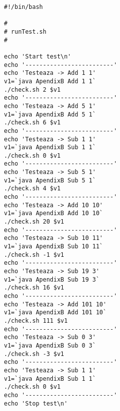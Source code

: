 \scriptsize \begin{verbatim}
#!/bin/bash

#
# runTest.sh
#

echo 'Start test\n'
echo '-------------------------'
echo 'Testeaza -> Add 1 1'
v1=`java ApendixB Add 1 1`
./check.sh 2 $v1
echo '-------------------------'
echo 'Testeaza -> Add 5 1'
v1=`java ApendixB Add 5 1`
./check.sh 6 $v1
echo '-------------------------'
echo 'Testeaza -> Sub 1 1'
v1=`java ApendixB Sub 1 1`
./check.sh 0 $v1
echo '-------------------------'
echo 'Testeaza -> Sub 5 1'
v1=`java ApendixB Sub 5 1`
./check.sh 4 $v1
echo '-------------------------'
echo 'Testeaza -> Add 10 10'
v1=`java ApendixB Add 10 10`
./check.sh 20 $v1
echo '-------------------------'
echo 'Testeaza -> Sub 10 11'
v1=`java ApendixB Sub 10 11`
./check.sh -1 $v1
echo '-------------------------'
echo 'Testeaza -> Sub 19 3'
v1=`java ApendixB Sub 19 3`
./check.sh 16 $v1
echo '-------------------------'
echo 'Testeaza -> Add 101 10'
v1=`java ApendixB Add 101 10`
./check.sh 111 $v1
echo '-------------------------'
echo 'Testeaza -> Sub 0 3'
v1=`java ApendixB Sub 0 3`
./check.sh -3 $v1
echo '-------------------------'
echo 'Testeaza -> Sub 1 1'
v1=`java ApendixB Sub 1 1`
./check.sh 0 $v1
echo '-------------------------'
echo 'Stop test\n'

\end{verbatim}

\newpage


